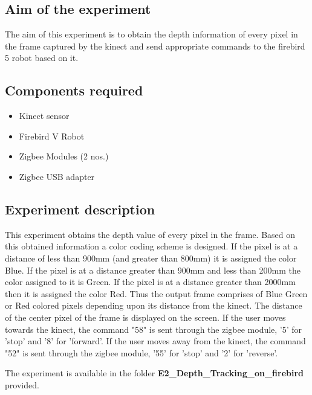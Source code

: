 \begin{flushleft}
\medskip
\subsection{\textbf{ Aim of the experiment}}
The aim of this experiment is to obtain the depth information of every pixel in the frame captured by the kinect and send appropriate commands to the firebird 5 robot based on it.
\medskip

\subsection{\textbf{ Components required}}
\begin{itemize}
\item Kinect sensor
\item Firebird V Robot
\item Zigbee Modules (2 nos.)
\item Zigbee USB adapter
\end{itemize}

\subsection{\textbf{ Experiment description}}
This experiment obtains the depth value of every pixel in the frame. Based on this obtained information a color coding scheme is designed. If the pixel is at a distance of less than 900mm (and greater than 800mm) it is assigned the color Blue. If the pixel is at a distance greater than 900mm and less than 200mm the color assigned to it is Green. If the pixel is at a distance greater than 2000mm then it is assigned the color Red. Thus the output frame comprises of Blue Green or Red colored pixels depending upon its distance from the kinect. 
The distance of the center pixel of the frame is displayed on the screen. If the user moves towards the kinect, the command "58" is sent through the zigbee module, '5' for 'stop' and '8' for 'forward'. If the user moves away from the kinect, the command "52" is sent through the zigbee module, '55' for 'stop' and '2' for 'reverse'.

\medskip
The experiment is available in the folder \textbf{E2\_Depth\_Tracking\_on\_firebird} provided.
\medskip


\end{flushleft}
